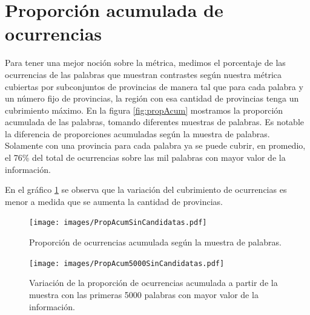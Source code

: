 \section{Proporción acumulada de ocurrencias} %
\label{proporcionDeOcurrencias}

Para tener una mejor noción sobre la métrica, medimos el porcentaje de las ocurrencias de las palabras que muestran contrastes según nuestra métrica cubiertas por subconjuntos de provincias de manera tal que para cada palabra y un número fijo de provincias, la región con esa cantidad de provincias tenga un cubrimiento máximo. 
En la figura \ref{fig:propAcum} mostramos la proporción acumulada de las palabras, tomando diferentes muestras de palabras. Es notable la diferencia de proporciones acumuladas según la muestra de palabras. Solamente con una provincia para cada palabra ya se puede cubrir, en promedio, el 76\% del total de ocurrencias sobre las mil palabras con mayor valor de la información.

En el gráfico \ref{fig:propAcum5000} se observa que la variación del cubrimiento de ocurrencias es menor a medida que se aumenta la cantidad de provincias. 



\begin{figure}[!ht]\centering
  \begin{minipage}[t]{0.49\textwidth}
    \texttt{[image: images/PropAcumSinCandidatas.pdf]}
    \caption{Proporción de ocurrencias acumulada según la muestra de palabras.} 
    \label{fig:propAcum} 
   \end{minipage}
   \begin{minipage}[t]{0.49\textwidth}
    \texttt{[image: images/PropAcum5000SinCandidatas.pdf]}
    \caption{Variación de la proporción de ocurrencias acumulada a partir de la muestra con las primeras 5000 palabras con mayor valor de la información.} 
    \label{fig:propAcum5000} 
   \end{minipage}
   
\end{figure}




